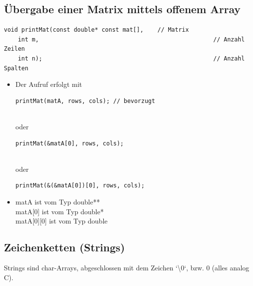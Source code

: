 \subsection{Übergabe einer Matrix mittels offenem Array}
\vspace{-\baselineskip}
\begin{minipage}{0.65\linewidth}
\begin{lstlisting}
void printMat(const double* const mat[],	// Matrix
	int m,													// Anzahl Zeilen
	int n);													// Anzahl Spalten
\end{lstlisting}
\end{minipage}

\begin{itemize}
	\item Der Aufruf erfolgt mit\\
	\begin{minipage}{0.6\linewidth}
	\vspace{-\baselineskip}
\begin{lstlisting}
printMat(matA, rows, cols); // bevorzugt
\end{lstlisting}
	\end{minipage}\\
	oder\\
	\begin{minipage}{0.6\linewidth}
	\vspace{-\baselineskip}
\begin{lstlisting}
printMat(&matA[0], rows, cols);
\end{lstlisting}
	\end{minipage}\\
	oder\\
	\begin{minipage}{0.6\linewidth}
	\vspace{-\baselineskip}
\begin{lstlisting}
printMat(&(&matA[0])[0], rows, cols);
\end{lstlisting}
	\end{minipage}
	\item matA \hspace{1cm} ist vom Typ double**\\
	matA[0] \hspace{6mm} ist vom Typ double*\\
	matA[0][0] \hspace{2mm} ist vom Typ double
\end{itemize}

\subsection{Zeichenketten (Strings)}
Strings sind char-Arrays, abgeschlossen mit dem Zeichen `\textbackslash0`, bzw. 0 (alles analog C).

